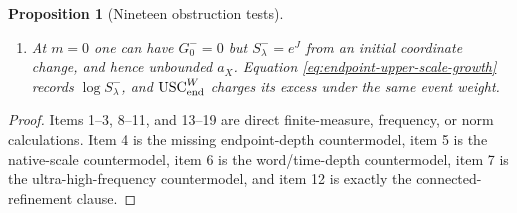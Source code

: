 \documentclass[11pt]{article}
\newtheorem{proposition}[theorem]{Proposition}
\begin{document}
\begin{proposition}[Nineteen obstruction tests]
\begin{enumerate}[label=\textup{(T\arabic*)}]
      two amplitudes on the same common atlas.  Their uniform majorant ledgers
      hold but neither difference quotient converges.  Equations
      \eqref{eq:regular-DQ-weak-convergence} and
      \eqref{eq:face-DQ-weak-convergence} reject both versions.
\item At $m=0$ one can have $G_0^-=0$ but
      $S_\lambda^-=e^J$ from an initial coordinate change, and hence
      unbounded $a_X$.  Equation \eqref{eq:endpoint-upper-scale-growth} records
      $\log S_\lambda^-$, and $\mathrm{USC}_{\rm end}^{W}$ charges its excess
      under the same event weight.
\end{enumerate}
\end{proposition}

\begin{proof}
Items 1--3, 8--11, and 13--19 are direct finite-measure, frequency, or norm
calculations.  Item 4 is the missing endpoint-depth countermodel, item 5 is
the native-scale countermodel, item 6 is the word/time-depth countermodel,
item 7 is the ultra-high-frequency countermodel, and item 12 is exactly the
connected-refinement clause.
\end{proof}
\end{document}
